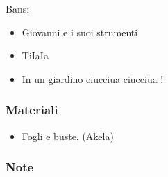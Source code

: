 \documentclass[../main.tex]{subfiles}
\begin{document}
        Bans:
        \begin{itemize}
            \item Giovanni e i suoi strumenti
            \item TiIaIa
            \item In un giardino ciucciua ciucciua ! 
        \end{itemize}

        \subsubsection{Materiali}
        \begin{itemize}
            \item Fogli e buste. (Akela)
        \end{itemize}
        \subsubsection{Note}
   
\end{document}
